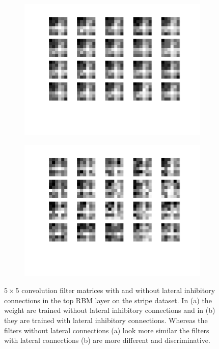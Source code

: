 \begin{figure}[h!]
	\centering
	\begin{subfigure}[t]{.45\textwidth}
  		\centering
  		\includegraphics[width=.9\linewidth]{imgs/inhib/02129.png}
  		\caption{}
  		\label{fig:sub1}
	\end{subfigure}%
	\begin{subfigure}[t]{.45\textwidth}
  		\centering
  		\includegraphics[width=.9\linewidth]{imgs/inhib/03023.png}
  		\caption{}
  		\label{fig:sub2}
	\end{subfigure}
	\caption{$5 \times 5$ convolution filter matrices with and without lateral inhibitory connections in the top RBM layer on the stripe dataset. In (a) the weight are trained without lateral inhibitory connections and in (b) they are trained with lateral inhibitory connections. Whereas the filters without lateral connections (a) look more similar the filters with lateral connections (b) are more different and discriminative. }
	\label{fig:latconstr}
\end{figure}

